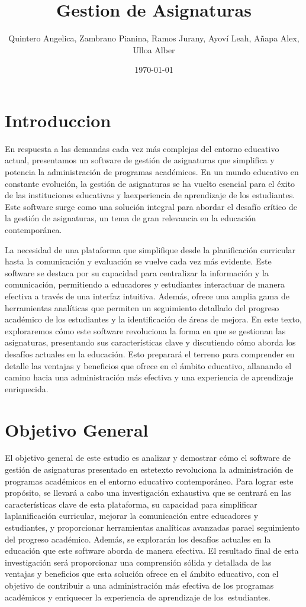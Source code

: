 \documentclass[11pt]{article}
\title{ Gestion de Asignaturas}
\author{ Quintero Angelica, Zambrano Pianina, Ramos Jurany, Ayoví Leah, Añapa Alex, Ulloa Alber }
\date{\today}
\begin{document}
\maketitle	
\section{Introduccion}

En respuesta a las demandas cada vez más complejas del
entorno educativo actual, presentamos un software de gestión de
asignaturas que simplifica y potencia la administración de
programas académicos. En un mundo educativo en constante
evolución, la gestión de asignaturas se ha vuelto esencial
para el éxito de las instituciones educativas y laexperiencia 
de aprendizaje de los estudiantes. Este software surge como
una solución integral para abordar el desafío crítico de la 
gestión de asignaturas, un tema de gran relevancia en la
educación contemporánea.


La necesidad de una plataforma que simplifique desde la
planificación curricular hasta la comunicación y
evaluación se vuelve cada vez más evidente. Este software se
destaca por su capacidad para centralizar la información
y la comunicación, permitiendo a educadores y estudiantes
interactuar de manera efectiva a través de una interfaz
intuitiva. Además, ofrece una amplia gama de herramientas
analíticas que permiten un seguimiento detallado del progreso
académico de los estudiantes y la identificación de áreas de
mejora. En este texto, exploraremos cómo este
software revoluciona la forma en que se gestionan las
asignaturas, presentando sus características clave y
discutiendo
cómo aborda los desafíos actuales en la educación. Esto
preparará el terreno para comprender en detalle las ventajas y
beneficios que ofrece en el ámbito educativo, allanando el
camino hacia una administración más efectiva y una
experiencia de aprendizaje enriquecida.
\section{Objetivo General}

El objetivo general de este estudio es analizar y demostrar
cómo el software de gestión de asignaturas presentado en
estetexto
revoluciona la administración de programas académicos en el
entorno educativo contemporáneo. Para lograr este propósito,
se llevará a
cabo una investigación exhaustiva que se centrará en las
características clave de esta plataforma, su capacidad para
simplificar laplanificación curricular, mejorar la
comunicación entre educadores y estudiantes, y proporcionar
herramientas analíticas avanzadas parael seguimiento del
progreso académico. Además, se explorarán los desafíos
actuales en la educación que este software aborda de manera
efectiva. El resultado final de esta investigación será
proporcionar una comprensión sólida y detallada de las
ventajas y beneficios que esta solución ofrece en el ámbito
educativo, con el objetivo de contribuir a una administración
más efectiva de los programas académicos y enriquecer la
experiencia de aprendizaje de los estudiantes.
\end{document}
